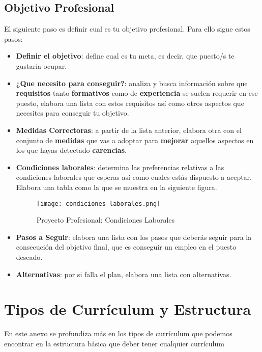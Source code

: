 \subsection{Objetivo Profesional}
El siguiente paso es definir cual es tu objetivo profesional. Para ello sigue estos pasos:

\begin{itemize}
    \item \textbf{Definir el objetivo}: define cual es tu meta, es decir, que puesto/s te gustaría ocupar.

    \item \textbf{¿Que necesito para conseguir?}: analiza y busca información sobre que \textbf{requisitos} tanto \textbf{formativos} como de \textbf{experiencia} se suelen requerir en ese puesto, elabora una lista con estos requisitos así como otros aspectos que necesites para conseguir tu objetivo.

    \item \textbf{Medidas Correctoras}: a partir de la lista anterior, elabora otra con el conjunto de \textbf{medidas} que vas a adoptar para \textbf{mejorar} aquellos aspectos en los que hayas detectado \textbf{carencias}.

    \item \textbf{Condiciones laborales}: determina las preferencias relativas a las condiciones laborales que esperas así como cuales estás dispuesto a aceptar. Elabora una tabla como la que se muestra en la siguiente figura.
    \begin{figure}[ht]
        \centering
        \texttt{[image: condiciones-laborales.png]}
        \caption{Proyecto Profesional: Condiciones Laborales}
    \end{figure}

    \item \textbf{Pasos a Seguir}: elabora una lista con los pasos que deberás seguir para la consecución del objetivo final, que es conseguir un empleo en el puesto deseado.

    \item \textbf{Alternativas}: por si falla el plan, elabora una lista con alternativas.
\end{itemize}

\section{Tipos de Currículum y Estructura}
En este anexo se profundiza más en los tipos de currículum que podemos encontrar en la estructura básica que deber tener cualquier currículum

